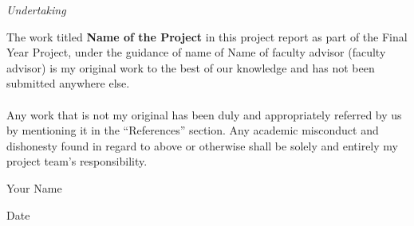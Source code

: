 \newpage
\thispagestyle{empty}

\begin{center}

\emph{\LARGE Undertaking}\\[2.5cm]
\end{center}

\normalsize The work titled \textbf{Name of the Project} in this project report as part of the
Final Year Project, under the guidance of name of Name of faculty advisor (faculty advisor) is my original work to the best of our knowledge and has not been
submitted anywhere else.
\paragraph{} Any work that is not my original has been duly and appropriately referred by us by mentioning it
in the “References” section.
Any academic misconduct and dishonesty found in regard to above or otherwise shall be solely
and entirely my project team’s responsibility.\\[1.0cm]



\raggedright Your Name\\
\raggedright Date\\


